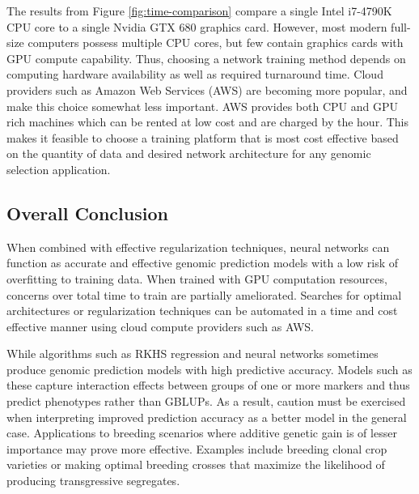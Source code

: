The results from Figure \ref{fig:time-comparison} compare a single Intel i7-4790K CPU 
core to a single Nvidia GTX 680 graphics card. However, most modern full-size computers possess 
multiple CPU cores, but few contain graphics cards with GPU compute capability. 
Thus, choosing a network training method depends on computing hardware availability 
as well as required turnaround time. Cloud providers such as Amazon Web Services (AWS) 
are becoming more popular, and make this choice somewhat less important. AWS 
provides both CPU and GPU rich machines which can be rented at low cost and 
are charged by the hour. This makes it feasible to choose a training platform 
that is most cost effective based on the quantity of data and desired network 
architecture for any genomic selection application.

\ifdefined\showtablesandfigures
\fi

\subsection*{Overall Conclusion}

When combined with effective regularization techniques, neural networks can function
as accurate and effective genomic prediction models with a low risk of overfitting
to training data. When trained with GPU computation resources, concerns
over total time to train are partially ameliorated. Searches for optimal architectures or 
regularization techniques can be automated in a time and cost effective 
manner using cloud compute providers such as AWS.

While algorithms such as RKHS regression and neural networks sometimes produce
genomic prediction models with high predictive accuracy. Models such as these
capture interaction effects between groups of one or more markers and thus 
predict phenotypes rather than GBLUPs. As a result, caution must be exercised when interpreting 
improved prediction accuracy as a better model in the general case. Applications 
to breeding scenarios where additive genetic gain is of lesser importance 
may prove more effective. Examples include breeding clonal crop varieties or 
making optimal breeding crosses that maximize the likelihood of producing
transgressive segregates.
